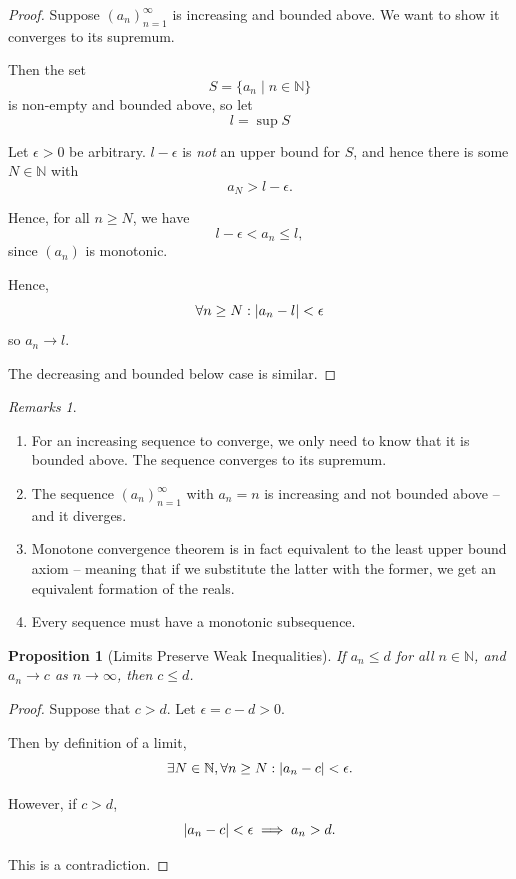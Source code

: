 \documentclass{article}
\newtheorem{proposition}[theorem]{Proposition}
\theoremstyle{definition}
\theoremstyle{remark}
\newtheorem{remarks}[theorem]{Remarks}
\DeclarePairedDelimiter{\abs}{\lvert}{\rvert}
\newcommand{\pqty}[1]{\left(#1\right)}
\newcommand{\set}[2]{\{#1\mid #2\}}
\newcommand{\NN}{\mathbb{N}}
\begin{document}
\begin{proof}
    Suppose \(\pqty{a_n}_{n = 1}^{\infty}\) is increasing and bounded above. We want to show it converges to its supremum.

    Then the set
    \[
        S = \set{a_n}{n \in \NN}
    \]
    is non-empty and bounded above, so let
    \[
        l = \sup S
    \]

    Let \(\epsilon > 0\) be arbitrary. \(l - \epsilon\) is \emph{not} an upper bound for \(S\), and hence there is some \(N \in \NN\) with
    \[
        a_N > l - \epsilon.
    \]

    Hence, for all \(n \geq N\), we have
    \[
        l - \epsilon < a_n \leq l,
    \]
    since \(\pqty{a_n}\) is monotonic.

    Hence,
    \[
        \forall n \geq N: \abs{a_n - l} < \epsilon
    \]
    so \(a_n \to l\).

    The decreasing and bounded below case is similar.
\end{proof}

\begin{remarks}
    \begin{enumerate}
        \item For an increasing sequence to converge, we only need to know that it is bounded above. The sequence converges to its supremum.
        \item The sequence \(\pqty{a_n}_{n = 1}^{\infty}\) with \(a_n = n\) is increasing and not bounded above -- and it diverges.
        \item Monotone convergence theorem is in fact equivalent to the least upper bound axiom -- meaning that if we substitute the latter with the former, we get an equivalent formation of the reals.
        \item Every sequence must have a monotonic subsequence.
    \end{enumerate}
\end{remarks}

\begin{proposition}[Limits Preserve Weak Inequalities]
    If \(a_n \leq d\) for all \(n \in \NN\), and \(a_n \to c\) as \(n \to \infty\), then \(c \leq d\).
\end{proposition}

\begin{proof}
    Suppose that \(c > d\). Let \(\epsilon = c - d > 0\).

    Then by definition of a limit,
    \[
        \exists N \in \NN, \forall n \geq N: \abs{a_n - c} < \epsilon.
    \]

    However, if \(c > d\),
    \[
        \abs{a_n - c} < \epsilon \implies a_n > d.
    \]

    This is a contradiction.
\end{proof}
\end{document}
